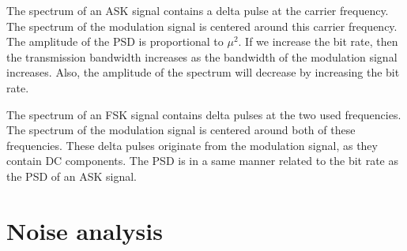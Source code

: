 \documentclass[11pt,titlepage]{report}
\begin{document}
\begin{appendices}
The spectrum of an ASK signal contains a delta pulse at the carrier frequency. The spectrum of the modulation signal is centered around this carrier frequency. The amplitude of the PSD is proportional to $\mu^2$. If we increase the bit rate, then the transmission bandwidth increases as the bandwidth of the modulation signal increases. Also, the amplitude of the spectrum will decrease by increasing the bit rate.

The spectrum of an FSK signal contains delta pulses at the two used frequencies. The spectrum of the modulation signal is centered around both of these frequencies. These delta pulses originate from the modulation signal, as they contain DC components. The PSD is in a same manner related to the bit rate as the PSD of an ASK signal.

\section{Noise analysis}

\end{appendices}
\end{document}
